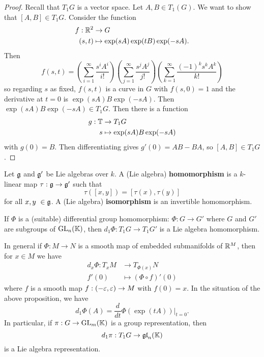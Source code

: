 \begin{proof}
  Recall that $T_1G$ is a vector space.
  Let $A,B \in T_1(G)$.
  We want to show that $[A,B] \in T_1G$.
  Consider the function
  \begin{align*}
    f: \mathbb{R}^2 &\to G \\
    (s,t) &\mapsto \exp(sA)\exp(tB)\exp(-sA).
  \end{align*}
  Then
  \[ f(s,t) = \left( \sum_{i=1}^\infty \frac{s^iA^i}{i!} \right) \left( \sum_{j=1}^\infty \frac{s^jA^j}{j!} \right) \left( \sum_{k=1}^\infty \frac{(-1)^ks^kA^k}{k!} \right) \]
  so regarding $s$ as fixed, $f(s,t)$ is a curve in $G$ with $f(s,0)=1$ and the derivative at $t=0$ is $\exp(sA)B\exp(-sA)$.
  Then $\exp(sA)B\exp(-sA) \in T_1G$.
  Then there is a function
  \begin{align*}
    g: \mathbb{T} &\to T_1G \\
    s &\mapsto \exp(sA)B\exp(-sA)
  \end{align*}
  with $g(0)=B$.
  Then differentiating gives $g'(0)=AB-BA$, so $[A,B] \in T_1G$.
\end{proof}

\begin{defn}
  Let $\mathfrak{g}$ and $\mathfrak{g}'$ be Lie algebras over $k$.
  A (Lie algebra) \textbf{homomorphism} is a $k$-linear map $\tau: \mathfrak{g} \to \mathfrak{g}'$ such that
  \[ \tau([x,y])=[\tau(x),\tau(y)] \]
  for all $x,y\ \in \mathfrak{g}$.
  A (Lie algebra) \textbf{isomorphism} is an invertible homomorphism.
\end{defn}

\begin{prop}
  If $\Phi$ is a (suitable) differential group homomorphism: $\Phi: G \to G'$ where $G$ and $G'$ are subgroups of $\operatorname{GL}_n(\mathbb{K})$, then $d_1\Phi: T_1G \to T_1G'$ is a Lie algebra homomorphism.
\end{prop}

\begin{rmk}
  In general if $\Phi: M \to N$ is a smooth map of embedded submanifolds of $\mathbb{R}^M$, then for $x \in M$ we have
  \begin{align*}
    d_x\Phi: T_xM &\to T_{\Phi(x)}N \\
    f'(0) &\mapsto (\Phi\circ f)'(0)
  \end{align*}
  where $f$ is a smooth map $f:(-\varepsilon,\varepsilon) \to M$ with $f(0)=x$.
  In the situation of the above proposition, we have
  \[ d_1 \Phi(A) = \frac{d}{dt} \Phi(\exp(tA))\Big\vert_{t=0}. \]
  In particular, if $\pi: G \to \operatorname{GL}_m(\mathbb{K})$ is a group representation, then
  \[ d_1\pi: T_1G \to \operatorname{\mathfrak{gl}}_n(\mathbb{K}) \]
  is a Lie algebra representation.
\end{rmk}

